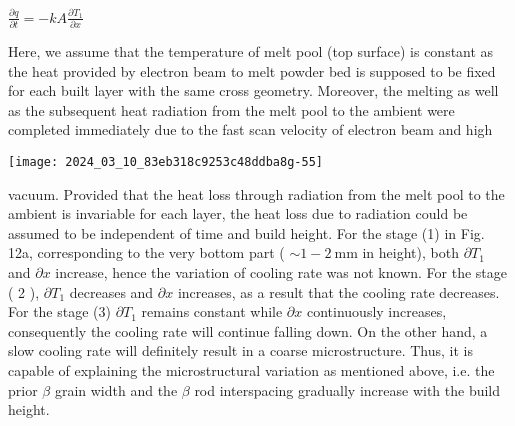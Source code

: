 \documentclass[10pt]{article}
\begin{document}
$\frac{\partial q}{\partial t}=-k A \frac{\partial T_{1}}{\partial x}$

Here, we assume that the temperature of melt pool (top surface) is constant as the heat provided by electron beam to melt powder bed is supposed to be fixed for each built layer with the same cross geometry. Moreover, the melting as well as the subsequent heat radiation from the melt pool to the ambient were completed immediately due to the fast scan velocity of electron beam and high

\begin{center}
\texttt{[image: 2024\_03\_10\_83eb318c9253c48ddba8g-55]}
\end{center}

vacuum. Provided that the heat loss through radiation from the melt pool to the ambient is invariable for each layer, the heat loss due to radiation could be assumed to be independent of time and build height. For the stage (1) in Fig. 12a, corresponding to the very bottom part ( $\sim 1-2 \mathrm{~mm}$ in height), both $\partial T_{1}$ and $\partial x$ increase, hence the variation of cooling rate was not known. For the stage ( 2 ), $\partial T_{1}$ decreases and $\partial x$ increases, as a result that the cooling rate decreases. For the stage (3) $\partial T_{1}$ remains constant while $\partial x$ continuously increases, consequently the cooling rate will continue falling down. On the other hand, a slow cooling rate will definitely result in a coarse microstructure. Thus, it is capable of explaining the microstructural variation as mentioned above, i.e. the prior $\beta$ grain width and the $\beta$ rod interspacing gradually increase with the build height.
\end{document}
